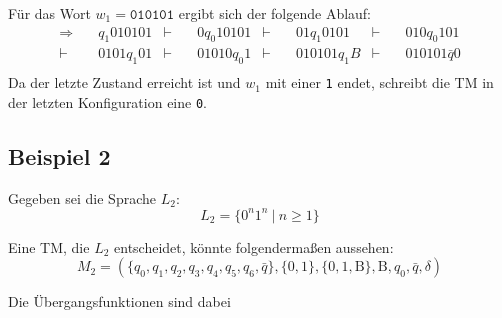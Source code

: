 \documentclass{scrartcl}%
\begin{document}
    Für das Wort $w_1=\texttt{010101}$ ergibt sich der folgende Ablauf:
    \begin{equation*}
        \begin{align}
            \Rightarrow \quad & q_{1}010101 & \vdash \quad & 0q_{0}10101 & \vdash \quad & 01q_{1}0101 & \vdash \quad & 010q_{0}101\\
            \vdash \quad & 0101q_{1}01 & \vdash \quad & 01010q_{0}1 & \vdash \quad & 010101q_{1}B & \vdash \quad & 010101\bar{q}0\\
        \end{align}
    \end{equation*}
    Da der letzte Zustand erreicht ist und $w_1$ mit einer \texttt{1} endet, schreibt die TM in der letzten Konfiguration eine \texttt{0}.

    \newpage
    \subsection*{Beispiel 2}
    Gegeben sei die Sprache $L_2$:
    \begin{equation*}
        L_2 = \{0^n 1^n \ | \ n \geq 1 \}
    \end{equation*}

    Eine TM, die $L_2$ entscheidet, könnte folgendermaßen aussehen:
    \begin{equation*}
        M_2 = (\{q_0, q_1,q_2,q_3,q_4,q_5,q_6,\bar{q}\},\{0,1\},\{0,1,\text{B}\}, \text{B}, q_0, \bar{q}, \delta)
    \end{equation*}

    Die Übergangsfunktionen sind dabei
\end{document}

